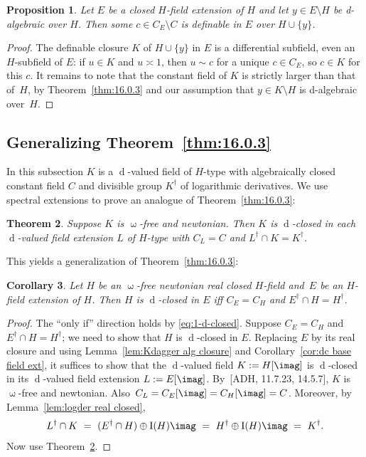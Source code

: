 \documentclass[]{amsart}
\numberwithin{equation}{section}
\def \I{\operatorname{I}}
\def \d{\operatorname{d}}
\newtheorem{theorem}{Theorem}[section]
\newtheorem{prop}[theorem]{Proposition}
\newtheorem{cor}[theorem]{Corollary}
\theoremstyle{definition}
\theoremstyle{remark}
\def \upo{\upomega}
\begin{document}
\begin{prop}
  Let $E$ be a closed $H$-field extension of $H$ and let $y \in E \setminus H$ be d-algebraic over $H$.
  Then some $c\in C_E \setminus C$ is definable in $E$ over $H\cup\{y\}$.
\end{prop}

\begin{proof}
 The definable closure $K$ of $H \cup \{y\}$ in $E$ is a differential subfield, even an
  $H$-subfield of $E$:  if $u\in K$ and $u \asymp 1$, then $u\sim c$ for a unique $c\in C_E$,
 so  $c \in K$ for this $c$. 
It remains to note that the constant field of $K$ is strictly larger than that of~$H$, by Theorem~\ref{thm:16.0.3} and
  our assumption that $y \in K \setminus H$ is d-algebraic over~$H$.
\end{proof}

\subsection*{Generalizing Theorem~\ref{thm:16.0.3}}  
In this subsection $K$ is a $\d$-valued field of $H$-type with algebraically closed constant field $C$ and divisible group $K^\dagger$ of logarithmic derivatives.
We use spectral extensions to prove an analogue of Theorem~\ref{thm:16.0.3}: 

\begin{theorem}\label{noextension} Suppose $K$ is  $\upo$-free and newtonian. Then $K$ is $\d$-closed in each 
$\d$-valued field extension $L$ of $H$-type with $C_L=C$ and $L^\dagger\cap K=K^\dagger$. 
\end{theorem} 

\noindent
This yields a generalization of Theorem~\ref{thm:16.0.3}:

\begin{cor}\label{cor:noextension}
Let $H$ be an $\upo$-free newtonian real closed  $H$-field and~$E$ be an $H$-field extension of $H$. 
Then $H$ is $\d$-closed in
$E$ iff $C_E=C_H$ and $E^\dagger\cap H=H^\dagger$.
\end{cor}
\begin{proof}
The ``only if'' direction holds by \eqref{eq:1-d-closed}. Suppose $C_E=C_H$ and $E^\dagger\cap H=H^\dagger$; we need to show that
$H$ is $\d$-closed in $E$.  
Replacing $E$ by its real closure and using
Lemma~\ref{lem:Kdagger alg closure} and Corollary~\ref{cor:dc base field ext},
it suffices to show that the $\d$-valued field $K:=H[\imag]$ is $\d$-closed in its  $\d$-valued field extension $L:=E[\imag]$.
By~[ADH, 11.7.23, 14.5.7], $K$ is $\upo$-free and newtonian. Also~${C_L=C_E[\imag]=C_H[\imag]=C}$. 
Moreover, by Lemma~\ref{lem:logder real closed}, 
$$L^\dagger\cap K\ =\ (E^\dagger\cap H)\oplus\I(H)\imag\ =\  H^\dagger\oplus\I(H)\imag\ =\ K^\dagger.$$
Now use Theorem~\ref{noextension}.
\end{proof}
\end{document}
